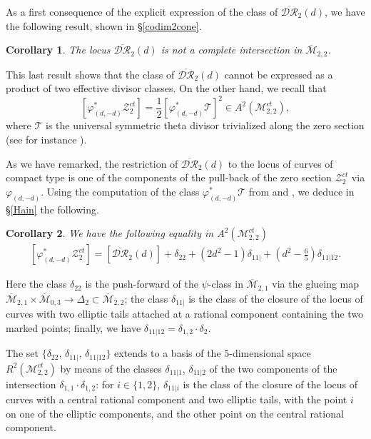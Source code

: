 \documentclass[10pt]{amsart}
\newtheorem{cor}{Corollary}[section]
\theoremstyle{definition}
\begin{document}
As a first consequence of the explicit expression of the class of $\overline{\mathcal{DR}}_2(d)$, we have the following result, shown in \S \ref{codim2cone}.

\begin{cor}
\label{CI}
The locus $\overline{\mathcal{DR}}_2(d)$ is not a complete intersection in ${\overline{\mathcal{M}}}_{2,2}$.
\end{cor}

This last result shows that the class of $\overline{\mathcal{DR}}_2(d)$ cannot be expressed as a product of two effective divisor classes. On the other hand, we recall that 
\[
 \left[\varphi^*_{(d,-d)}{\mathcal{Z}}^{ct}_2\right] = \frac{1}{2}\left[\varphi_{(d,-d)}^*\mathcal{T} \right]^2 \in A^2({\mathcal{M}}^{ct}_{2,2}),
\]
where $\mathcal{T}$ is the universal symmetric theta divisor trivialized along the zero section (see for instance \cite{GZ1}). 

As we have remarked, the restriction of $\overline{\mathcal{DR}}_2(d)$ to the locus of curves of compact type is one of the components of the pull-back of the zero section ${\mathcal{Z}}^{ct}_2$ via $\varphi_{(d,-d)}$.
Using the computation of the class $\varphi_{(d,-d)}^*\mathcal{T}$ from \cite{Hain} and \cite{GZ1}, we deduce in \S \ref{Hain} the following.

\begin{cor}
\label{Hain-AC}
We have the following equality in $A^2(\mathcal{M}^{ct}_{2,2})$
\begin{eqnarray}
\label{HAC}
\left[\varphi^*_{(d,-d)}{\mathcal{Z}}^{ct}_2\right] = \left[\overline{\mathcal{DR}}_2(d) \right]+ \delta_{22}+(2d^2-1)\delta_{11|}+ \left(d^2-\frac{6}{5}\right)\delta_{11|12}.
\end{eqnarray}
\end{cor}

Here the class $\delta_{22}$ is the push-forward of the $\psi$-class in ${\overline{\mathcal{M}}}_{2,1}$ via the glueing map ${\overline{\mathcal{M}}}_{2,1}\times {\overline{\mathcal{M}}}_{0,3}\rightarrow \Delta_2\subset{\overline{\mathcal{M}}}_{2,2}$;
the class $\delta_{11|}$ is the class of the closure of the locus of curves with two elliptic tails attached at a rational component containing the two marked points;
finally, we have $\delta_{11|12}=\delta_{1,2}\cdot\delta_2$.

The set $\{\delta_{22}$, $\delta_{11|}$, $\delta_{11|12}\}$ extends to a basis of the $5$-dimensional space $R^2(\mathcal{M}^{ct}_{2,2})$ by means of the classes $\delta_{11|1}$, $\delta_{11|2}$ of the two components of the intersection $\delta_{1,1}\cdot\delta_{1,2}$: for $i\in\{1,2\}$, $\delta_{11|i}$ is the class of the closure of the locus of curves with a central rational component and two elliptic tails, with the point $i$ on one of the elliptic components, and the other point on the central rational component.
\end{document}
